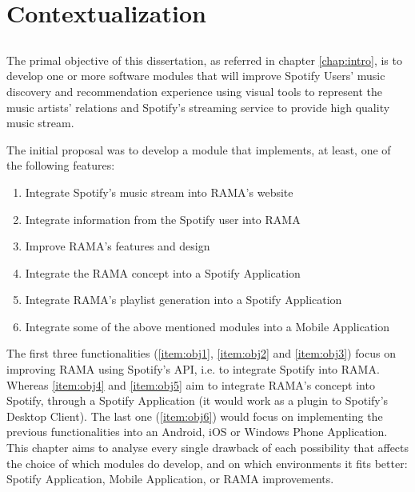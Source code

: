 
\chapter{Contextualization}
\label{chap:chap3}

\section*{}

The primal objective of this dissertation, as referred in chapter \ref{chap:intro}, is to develop one or more software modules that will improve Spotify Users' music discovery and recommendation experience using visual tools to represent the music artists' relations and Spotify's streaming service to provide high quality music stream.

The initial proposal was to develop a module that implements, at least, one of the following features:

\begin{enumerate}
  \item \label{item:obj1} Integrate Spotify's music stream into RAMA's website
  \item \label{item:obj2} Integrate information from the Spotify user into RAMA
  \item \label{item:obj3} Improve RAMA's features and design
  \item \label{item:obj4} Integrate the RAMA concept into a Spotify Application
  \item \label{item:obj5} Integrate RAMA's playlist generation into a Spotify Application
  \item \label{item:obj6} Integrate some of the above mentioned modules into a Mobile Application
\end{enumerate}

The first three functionalities (\ref{item:obj1}, \ref{item:obj2} and \ref{item:obj3}) focus on improving RAMA using Spotify's API, i.e. to integrate Spotify into RAMA.
Whereas \ref{item:obj4} and \ref{item:obj5} aim to integrate RAMA's concept into Spotify, through a Spotify Application (it would work as a plugin to Spotify's Desktop Client).
The last one (\ref{item:obj6}) would focus on implementing the previous functionalities into an Android, iOS or Windows Phone Application.
This chapter aims to analyse every single drawback of each possibility that affects the choice of which modules do develop, and on which environments it fits better: Spotify Application, Mobile Application, or RAMA improvements.

